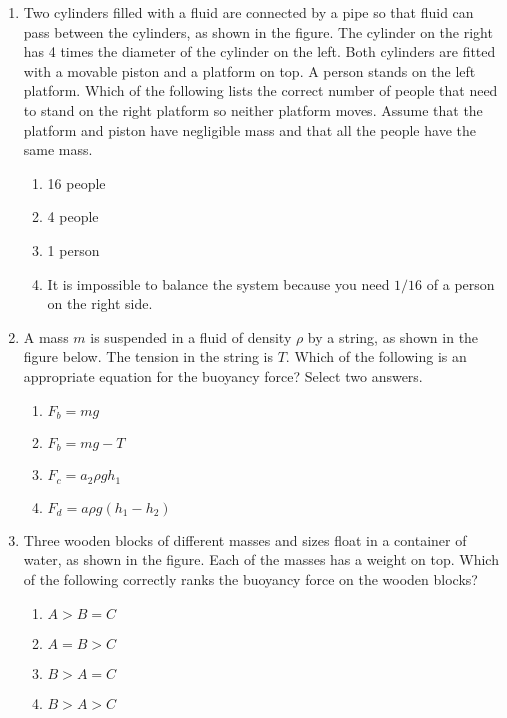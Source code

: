 \documentclass{../../../oss-classkick}
\begin{document}
\begin{multicols}{2}
\begin{enumerate}[leftmargin=18pt,resume]
  \item Two cylinders filled with a fluid are connected by a pipe so that fluid
    can pass between the cylinders, as shown in the figure. The cylinder on the
    right has 4 times the diameter of the cylinder on the left. Both cylinders
    are fitted with a movable piston and a platform on top. A person stands on
    the left platform. Which of the following lists the correct number of
    people that need to stand on the right platform so neither platform moves.
    Assume that the platform and piston have negligible mass and that all the
    people have the same mass.

    \vspace{-.1in}
    \begin{enumerate}[nosep,leftmargin=18pt,label=(\Alph*)]
    \item \num{16} people
    \item \num{4} people
    \item \num{1} person
    \item It is impossible to balance the system because you need $1/16$ of a
      person on the right side.
    \end{enumerate}
    \vspace{.7in}
    \columnbreak
    
  \item A mass $m$ is suspended in a fluid of density $\rho$ by a string, as
    shown in the figure below. The tension in the string is $T$. Which of the
    following is an appropriate equation for the buoyancy force? Select two
    answers.
    \begin{center}
      \vspace{-.15in}
    \end{center}
    \begin{enumerate}[nosep,leftmargin=18pt,label=(\Alph*)]
    \item $F_b=mg$
    \item $F_b=mg-T$
    \item $F_c=a_2 \rho gh_1$
    \item $F_d=a\rho g(h_1-h_2)$
    \end{enumerate}
    \vspace{.7in}
    
  \item Three wooden blocks of different masses and sizes float in a container
    of water, as shown in the figure. Each of the masses has a weight on top.
    Which of the following correctly ranks the buoyancy force on the wooden
    blocks?
    \begin{center}
      \vspace{-.15in}
    \end{center}
    \begin{enumerate}[nosep,leftmargin=18pt,label=(\Alph*)]
    \item $A > B = C$
    \item $A = B > C$
    \item $B > A = C$
    \item $B > A > C$
    \end{enumerate}
    

\end{enumerate}
\end{multicols}
\end{document}
